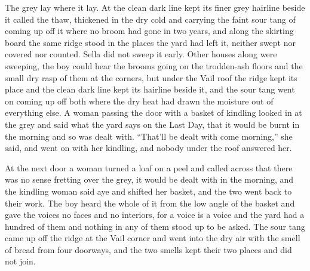 The grey lay where it lay. At  the clean dark line kept its finer grey hairline beside it called the thaw, thickened in the dry cold and carrying the faint sour tang of  coming up off it where no broom had gone in two years, and along the skirting board the same ridge stood in the places the yard had left it, neither swept nor covered nor counted. Sella did not sweep it early. Other houses along  were sweeping, the boy could hear the brooms going on the trodden-ash floors and the small dry rasp of them at the corners, but under the Vail roof the ridge kept its place and the clean dark line kept its hairline beside it, and the sour tang went on coming up off both where the dry heat had drawn the moisture out of everything else. A woman passing the door with a basket of kindling looked in at the grey and said what the yard says on the Last Day, that it would be burnt in the morning and so was dealt with. “That'll be dealt with come morning,” she said, and went on with her kindling, and nobody under the roof answered her.

At the next door a woman turned a loaf on a peel and called across that there was no sense fretting over the grey, it would be dealt with in the morning, and the kindling woman said aye and shifted her basket, and the two went back to their work. The boy heard the whole of it from the low angle of the basket and gave the voices no faces and no interiors, for a voice is a voice and the yard had a hundred of them and nothing in any of them stood up to be asked. The sour tang came up off the ridge at the Vail corner and went into the dry air with the smell of bread from four doorways, and the two smells kept their two places and did not join.

